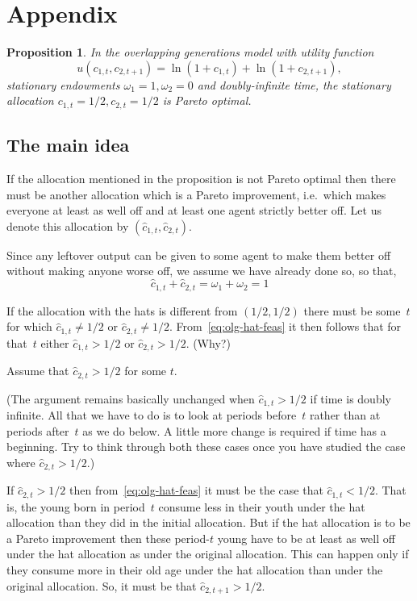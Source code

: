 \documentclass[12pt,reqno,openany]{amsbook}
\theoremstyle{plain}
\newtheorem{prop}{Proposition}[chapter]
\theoremstyle{definition}
\begin{document}
\section*{Appendix}
\begin{prop}
In the overlapping generations model with utility function
\[u(c_{1,t},c_{2,t+1})=\ln(1+c_{1,t})+\ln(1+c_{2,t+1}),\]
stationary endowments $\omega_1=1, \omega_2=0$ and doubly-infinite
time, the stationary allocation $c_{1,t}=1/2,c_{2,t}=1/2$ is Pareto
optimal.
\end{prop}

\subsection*{The main idea}
If the allocation mentioned in the proposition is not Pareto optimal then
there must be another allocation which is a Pareto improvement, i.e.\
which makes everyone at least as well off and at least one agent
strictly better off. Let us denote this allocation by $(\hat
c_{1,t},\hat c_{2,t})$. 

Since any leftover output can be given to some agent to make them
better off without making anyone worse off, we assume we have already
done so, so that,
\begin{equation}\label{eq:olg-hat-feas}
\hat c_{1,t}+\hat c_{2,t} = \omega_1+\omega_2 =1
\end{equation}

If the allocation with the hats is different from
$(1/2,1/2)$ there must be some~$t$ for which $\hat c_{1,t} \ne 1/2$ or
$\hat c_{2,t} \ne 1/2$. From~\eqref{eq:olg-hat-feas} it then follows
that for that~$t$ either $\hat c_{1,t}>1/2$ or $\hat c_{2,t}>1/2$. (Why?)

Assume that $\hat c_{2,t}>1/2$ for some $t$. 

(The argument remains basically unchanged when $\hat c_{1,t}>1/2$ if
time is doubly infinite. All that we have to do is to look at periods
before~$t$ rather than at periods after~$t$ as we do below. A little
more change is required if time has a beginning. Try to think through
both these cases once you have studied the case where $\hat
c_{2,t}>1/2$.)

If $\hat c_{2,t}>1/2$ then from~\eqref{eq:olg-hat-feas} it must be the
case that $\hat c_{1,t}<1/2$. That is, the young born in period~$t$
consume less in their youth under the hat allocation than they did in
the initial allocation. But if the hat allocation is to be a Pareto
improvement then these period-$t$ young have to be at least as well
off under the hat allocation as under the original allocation. This
can happen only if they consume more in their old age under the hat
allocation than under the original allocation. So, it must be that
$\hat c_{2,t+1}>1/2$.
\end{document}
